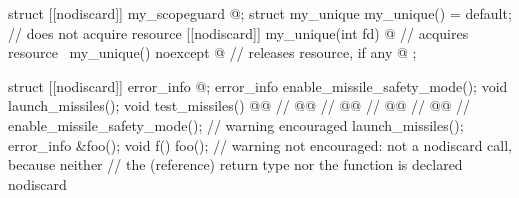 \documentclass[ebook,11pt,article]{memoir}
\begin{document}
\pnum
\begin{example}\begin{addedblock}\begin{codeblock}
struct [[nodiscard]] my_scopeguard { @\commentellip@ };
struct my_unique {
  my_unique() = default; // does not acquire resource
  [[nodiscard]] my_unique(int fd) { @\commentellip@ } // acquires resource
  ~my_unique() noexcept { @\commentellip@ } // releases resource, if any
  @\commentellip@
};
\end{codeblock}\end{addedblock}
\begin{codeblock}
struct [[nodiscard]] error_info { @\commentellip@ };
error_info enable_missile_safety_mode();
void launch_missiles();
void test_missiles() {
  @@              // 
  @@        // 
    @@          // 
  @@                // 
  @@                  // 
  enable_missile_safety_mode(); // warning encouraged
  launch_missiles();
}
error_info &foo();
void f() { foo(); }             // warning not encouraged: not a nodiscard call, because neither
                                // the (reference) return type nor the function is declared nodiscard
\end{codeblock}
\end{example}
\end{document}
